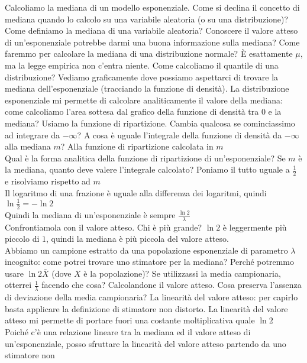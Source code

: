\documentclass{article}
\begin{document}
    Calcoliamo la mediana di un modello esponenziale. Come si declina il concetto di mediana quando lo calcolo su una variabile aleatoria (o su una distribuzione)? Come
    definiamo la mediana di una variabile aleatoria? Conoscere il valore atteso di un'esponenziale potrebbe darmi una buona informazione sulla mediana? Come faremmo per
    calcolare la mediana di una distribuzione normale? È esattamente $ \mu $, ma la legge empirica non c'entra niente. Come calcoliamo il quantile di una distribuzione?
    Vediamo graficamente dove possiamo aspettarci di trovare la mediana dell'esponenziale (tracciando la funzione di densità). La distribuzione esponenziale mi permette di
    calcolare analiticamente il valore della mediana: come calcoliamo l'area sottesa dal grafico della funzione di densità tra $ 0 $ e la mediana? Usiamo la funzione di
    ripartizione. Cambia qualcosa se cominciassimo ad integrare da $ - \infty $? A cosa è uguale l'integrale della funzione di densità da $ - \infty $ alla mediana $ m $? Alla
    funzione di ripartizione calcolata in $ m $ \\
    Qual è la forma analitica della funzione di ripartizione di un'esponenziale? Se $ m $ è la mediana, quanto deve valere l'integrale calcolato? Poniamo il tutto uguale a
    $ \frac{1}{2} $ e risolviamo rispetto ad $ m $ \\
    Il logaritmo di una frazione è uguale alla differenza dei logaritmi, quindi $ \ln{ \frac{ 1 }{ 2 }} = - \ln 2 $ \\
    Quindi la mediana di un'esponenziale è sempre $ \frac{ \ln 2 }{ \lambda } $ \\
    Confrontiamola con il valore atteso. Chi è più grande? $ \ln 2 $ è leggermente più piccolo di $ 1 $, quindi la mediana è più piccola del valore atteso. \\
    Abbiamo un campione estratto da una popolazione esponenziale di parametro $ \lambda $ incognito: come potrei trovare uno stimatore per la mediana? Perché potremmo usare
    $ \ln 2 \bar X $ (dove $ X $ è la popolazione)? Se utilizzassi la media campionaria, otterrei $ \frac{ 1 }{ \lambda } $ facendo che cosa? Calcolandone il valore atteso.
    Cosa preserva l'assenza di deviazione della media campionaria? La linearità del valore atteso: per capirlo basta applicare la definizione di stimatore non distorto. La
    linearità del valore atteso mi permette di portare fuori una costante moltiplicativa quale $ \ln 2 $ \\
    Poiché c'è una relazione lineare tra la mediana ed il valore atteso di un'esponenziale, posso sfruttare la linearità del valore atteso partendo da uno stimatore non
\end{document}
